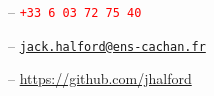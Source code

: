 
\vspace{4mm}
\centerline{\large{\faPhone} -- \textcolor{red}{\texttt{+33 6 03 72 75 40}}}
\vspace{1mm}
\centerline{\large{\faEnvelope} -- \textcolor{cyan}{\href{mailto:jack.halford@ens-cachan.fr}{\texttt{jack.halford@ens-cachan.fr}}}}
\vspace{1mm}
\centerline{\large{\faGithub} -- \textcolor{orange}{\url{https://github.com/jhalford}}}
\vspace{1mm}

\vspace{4mm}